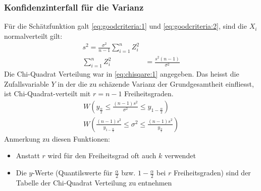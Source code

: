 \subsubsection{Konfidenzinterfall für die Varianz}
Für die Schätzfunktion galt \autoref{eq:goodcriteria:1} und \autoref{eq:goodcriteria:2}, sind die $X_i$ normalverteilt gilt:
\begin{align}
s^2=\frac{\sigma^2}{n-1}\sum^n_{i=1}Z_i^2& \\
\sum_{i=1}^n Z_i^2& = \frac{s^2(n-1)}{\sigma^2}
\end{align}
Die Chi-Quadrat Verteilung war in \autoref{eq:chisqare:1} angegeben. Das heisst die Zufallsvariable $Y$ in der die zu schäzende Varianz der Grundgesamtheit einfliesst, ist Chi-Quadrat-verteilt mit $r=n-1$ Freiheitsgraden.
\begin{align}
W\left(y_{\frac{\alpha}{2}} \leq \frac{(n-1)s^2}{\sigma^2} \leq y_{1-\frac{\alpha}{2}}\right)\\
W\left(\frac{(n-1)s^2}{y_{1-\frac{\alpha}{2}}} \leq\sigma^2 \leq\frac{(n-1)s^2}{y_{\frac{\alpha}{2}}}\right)
\end{align}
Anmerkung zu diesen Funktionen:
\begin{itemize}
\item Anstatt $r$ wird für den Freiheitsgrad oft auch $k$ verwendet
\item Die $y$-Werte (Quantilswerte für $\frac{\alpha}{2}$ bzw. $1-\frac{\alpha}{2}$ bei $r$ Freiheitsgraden) sind der Tabelle der Chi-Quadrat Verteilung zu entnehmen
\end{itemize}
